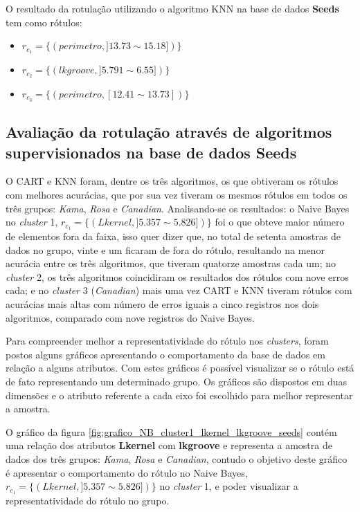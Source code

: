 O resultado da rotulação utilizando o algoritmo KNN na base de dados \textbf{Seeds} tem como rótulos: 
\begin{itemize}[noitemsep]
 \item ${r_{c_1}=\{ (perimetro, ]13.73 \sim 15.18]) \} }$
 \item ${r_{c_2}=\{ (lkgroove, ] 5.791 \sim  6.55]) \} }$
 \item ${r_{c_3}=\{ (perimetro, [12.41 \sim  13.73])\} }$
\end{itemize}


\subsection{Avaliação da rotulação através de algoritmos supervisionados na base de dados Seeds} \label{cap:resultados:ssec:compalgoritmos:seeds}


O CART e KNN foram, dentre os três algoritmos, os que obtiveram os rótulos com melhores acurácias, que por sua vez tiveram os mesmos rótulos em todos os três grupos: \textit{Kama}, \textit{Rosa} e \textit{Canadian}. Analisando-se os resultados: o Naive Bayes no \textit{cluster} 1, $r_{c_1}=\{ (Lkernel, ] 5.357 \sim  5.826 ]) \}$ foi o que obteve maior número de elementos fora da faixa, isso quer dizer que, no total de setenta amostras de dados no grupo, vinte e um ficaram de fora do rótulo, resultando na menor acurácia entre os três algoritmos, que tiveram quatorze amostras cada um; no \textit{cluster} 2, os três algoritmos coincidiram os resultados dos rótulos com nove erros cada; e no \textit{cluster} 3 (\textit{Canadian}) mais uma vez CART e KNN tiveram rótulos com acurácias mais altas com número de erros iguais a cinco registros nos dois algoritmos, comparado com nove registros do Naive Bayes. 


Para compreender melhor a representatividade do rótulo nos \textit{clusters}, foram postos alguns gráficos apresentando o comportamento da base de dados em relação a alguns atributos. Com estes gráficos é possível visualizar se o rótulo está de fato representando um determinado grupo. Os gráficos são dispostos em duas dimensões e o atributo referente a cada eixo foi escolhido para melhor representar a amostra. 

O gráfico da figura \ref{fig:grafico_NB_cluster1_lkernel_lkgroove_seeds} contém uma relação dos atributos \textbf{Lkernel} com \textbf{lkgroove} e representa a amostra de dados dos três grupos: \textit{Kama}, \textit{Rosa} e \textit{Canadian}, contudo o objetivo deste gráfico é apresentar o comportamento do rótulo  no Naive Bayes, $r_{c_1}=\{ (Lkernel, ] 5.357 \sim  5.826 ]) \}$ no \textit{cluster} 1, e poder visualizar a representatividade do rótulo no grupo.

